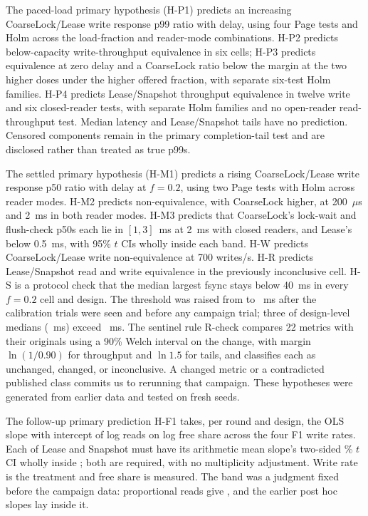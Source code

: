 The paced-load primary hypothesis (H-P1) predicts an increasing CoarseLock/Lease write response p99 ratio with delay, using four Page tests and Holm across the load-fraction and reader-mode combinations. H-P2 predicts below-capacity write-throughput equivalence in six cells; H-P3 predicts equivalence at zero delay and a CoarseLock ratio below the margin at the two higher doses under the higher offered fraction, with separate six-test Holm families. H-P4 predicts Lease/Snapshot throughput equivalence in twelve write and six closed-reader tests, with separate Holm families and no open-reader read-throughput test. Median latency and Lease/Snapshot tails have no prediction. Censored components remain in the primary completion-tail test and are disclosed rather than treated as true p99s.

The settled primary hypothesis (H-M1) predicts a rising CoarseLock/Lease write response p50 ratio with delay at $f=0.2$, using two Page tests with Holm across reader modes. H-M2 predicts non-equivalence, with CoarseLock higher, at 200~$\mu$s and 2~ms in both reader modes. H-M3 predicts that CoarseLock's lock-wait and flush-check p50s each lie in $[1,3]$~ms at 2~ms with closed readers, and Lease's below 0.5~ms, with 95\% $t$ CIs wholly inside each band. H-W predicts CoarseLock/Lease write non-equivalence at 700 writes/s. H-R predicts Lease/Snapshot read and write equivalence in the previously inconclusive cell. H-S is a protocol check that the median largest fsync stays below 40~ms in every $f=0.2$ cell and design. The threshold was raised from \HSDraftMs{} to \HSThresholdMs{}~ms after the calibration trials were seen and before any campaign trial; three of \HSDesignCount{} design-level medians (\HSAboveDraftRange{}~ms) exceed \HSDraftMs{}~ms. The sentinel rule R-check compares 22 metrics with their originals using a 90\% Welch interval on the change, with margin $\ln(1/0.90)$ for throughput and $\ln 1.5$ for tails, and classifies each as unchanged, changed, or inconclusive. A changed metric or a contradicted published class commits us to rerunning that campaign. These hypotheses were generated from earlier data and tested on fresh seeds.

The follow-up primary prediction H-F1 takes, per round and design, the OLS slope with intercept of log reads on log free share across the four F1 write rates. Each of Lease and Snapshot must have its arithmetic mean slope's two-sided \FollowCI{}\% $t$ CI wholly inside \FollowSlopeBand{}; both are required, with no multiplicity adjustment. Write rate is the treatment and free share is measured. The band was a judgment fixed before the campaign data: proportional reads give \FollowOne{}, and the earlier post hoc slopes lay inside it.

